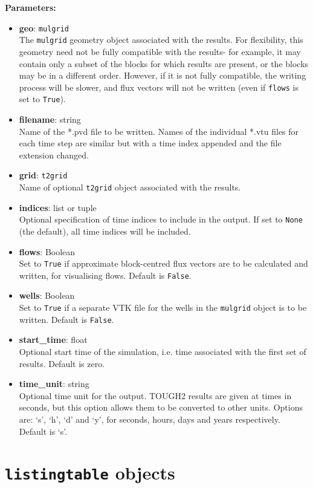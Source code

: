 \textbf{Parameters:}
\begin{itemize}
\item \textbf{geo}: \texttt{mulgrid}\\
  The \texttt{mulgrid} geometry object associated with the results.  For flexibility, this geometry need not be fully compatible with the results- for example, it may contain only a subset of the blocks for which results are present, or the blocks may be in a different order.  However, if it is not fully compatible, the writing process will be slower, and flux vectors will not be written (even if \texttt{flows} is set to \texttt{True}).
\item \textbf{filename}: string\\
  Name of the *.pvd file to be written.  Names of the individual *.vtu files for each time step are similar but with a time index appended and the file extension changed.
\item \textbf{grid}: \texttt{t2grid}\\
  Name of optional \texttt{t2grid} object associated with the results.
\item \textbf{indices}: list or tuple\\
  Optional specification of time indices to include in the output.  If set to \texttt{None} (the default), all time indices will be included.
\item \textbf{flows}: Boolean\\
  Set to \texttt{True} if approximate block-centred flux vectors are to be calculated and written, for visualising flows.  Default is \texttt{False}.
\item \textbf{wells}: Boolean\\
  Set to \texttt{True} if a separate VTK file for the wells in the \texttt{mulgrid} object is to be written.  Default is \texttt{False}.
\item \textbf{start\_time}: float\\
  Optional start time of the simulation, i.e. time associated with the first set of results.  Default is zero.
\item \textbf{time\_unit}: string\\
  Optional time unit for the output.  TOUGH2 results are given at times in seconds, but this option allows them to be converted to other units.  Options are: `s', `h', `d' and `y', for seconds, hours, days and years respectively.  Default is `s'.
\end{itemize}

\section{\texttt{listingtable} objects}
\label{listingtable}

